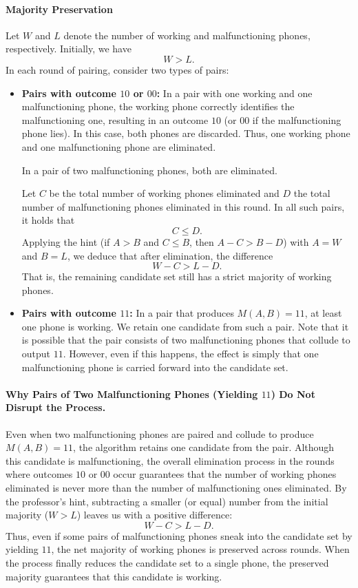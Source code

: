 \documentclass[11pt]{article}
\begin{document}
    \paragraph{Majority Preservation}
    Let $W$ and $L$ denote the number of working and malfunctioning phones, respectively. Initially, we have
    \[
    W > L.
    \]
    In each round of pairing, consider two types of pairs:
    \begin{itemize}
        \item \textbf{Pairs with outcome $10$ or $00$:}  
        In a pair with one working and one malfunctioning phone, the working phone correctly identifies the malfunctioning one, resulting in an outcome $10$ (or $00$ if the malfunctioning phone lies). In this case, both phones are discarded. Thus, one working phone and one malfunctioning phone are eliminated.
        
        In a pair of two malfunctioning phones, both are eliminated.
        
        Let $C$ be the total number of working phones eliminated and $D$ the total number of malfunctioning phones eliminated in this round. In all such pairs, it holds that 
        \[
        C \leq D.
        \]
        Applying the hint (if $A>B$ and $C\leq B$, then $A-C > B-D$) with $A=W$ and $B=L$, we deduce that after elimination, the difference 
        \[
        W - C > L - D.
        \]
        That is, the remaining candidate set still has a strict majority of working phones.
        
        \item \textbf{Pairs with outcome $11$:}  
        In a pair that produces $M(A,B)=11$, at least one phone is working. We retain one candidate from such a pair. Note that it is possible that the pair consists of two malfunctioning phones that collude to output $11$. However, even if this happens, the effect is simply that one malfunctioning phone is carried forward into the candidate set.
    \end{itemize}
    
    \paragraph{Why Pairs of Two Malfunctioning Phones (Yielding $11$) Do Not Disrupt the Process.}
    Even when two malfunctioning phones are paired and collude to produce $M(A,B)=11$, the algorithm retains one candidate from the pair. Although this candidate is malfunctioning, the overall elimination process in the rounds where outcomes $10$ or $00$ occur guarantees that the number of working phones eliminated is never more than the number of malfunctioning ones eliminated. By the professor's hint, subtracting a smaller (or equal) number from the initial majority ($W > L$) leaves us with a positive difference:
    \[
    W - C > L - D.
    \]
    Thus, even if some pairs of malfunctioning phones sneak into the candidate set by yielding $11$, the net majority of working phones is preserved across rounds. When the process finally reduces the candidate set to a single phone, the preserved majority guarantees that this candidate is working.
    
\end{document}
